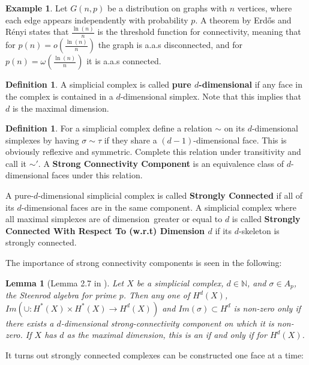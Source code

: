 \documentclass{article}
\theoremstyle{plain}
\newtheorem{lemma}[theorem]{Lemma}
\theoremstyle{definition}
\newtheorem{definition}[theorem]{Definition}
\newtheorem{example}[theorem]{Example}
\theoremstyle{remark}
\newcommand{\N}{\mathbb{N}}
\newcommand{\di}{dimension}
\begin{document}
\begin{example}
    
Let $G(n,p)$ be a distribution on graphs with $n$ vertices, where each edge appears independently with probability $p$.
A theorem by Erdős and Rényi states that $\frac{\ln(n)}{n}$ is the threshold function for connectivity, meaning that for $p(n)=o(\frac{\ln(n)}{n})$ the graph is a.a.s disconnected, and for $p(n)=\omega(\frac{\ln(n)}{n})$ it is a.a.s connected. \end{example} 

\begin{definition}
    A simplicial complex is called \textbf{pure $d$-dimensional}  if any face in the complex is contained in a $d$-\di al simplex. Note that this implies that $d$ is the maximal dimension.
\end{definition}
\begin{definition}\label{defStrongC}
 For a simplicial complex define a relation $\sim$ on its $d$-dimensional simplexes by having $\sigma \sim \tau$ if they share a $(d-1)$-dimensional face. 
 This is obviously reflexive and symmetric. Complete this relation under transitivity and call it $\sim'$. A \textbf{Strong Connectivity Component} is an equivalence class of $d$-dimensional faces under this relation. 
 
A pure-$d$-dimensional simplicial complex is called \textbf{Strongly Connected} if all of its $d$-\di al faces are in the same component. A simplicial complex where all maximal simplexes are of \di \ greater or equal to $d$ is called \textbf{Strongly Connected With Respect To (w.r.t) Dimension $d$} if its $d$-skeleton is strongly connected.
\end{definition}
The importance of strong connectivity components is seen in the following:
\begin{lemma}[Lemma 2.7 in \cite{kogan24}]\label{lemCupSteenConc}
Let $X$ be a simplicial complex, $d\in\N$, and $\sigma\in A_p$, the Steenrod algebra for prime $p$.
Then any one of $H^d(X)$,  $Im (\cup : H^*(X)\times H^*(X)\to H^d(X))$  and $Im(\sigma)\subset H^d$ is non-zero only if there exists a $d$-\di al strong-connectivity component on which it is non-zero. 
    If $X$ has $d$ as the maximal \di , this is an if and only if for $H^d(X)$.
\end{lemma}

It turns out strongly connected complexes can be constructed one face at a time:
\end{document}
